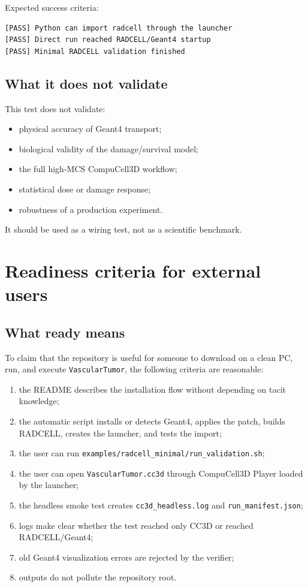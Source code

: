 \documentclass[11pt,a4paper,twoside,pdftex]{refrep}
\begin{document}
Expected success criteria:

\begin{lstlisting}
[PASS] Python can import radcell through the launcher
[PASS] Direct run reached RADCELL/Geant4 startup
[PASS] Minimal RADCELL validation finished
\end{lstlisting}

\section{What it does not validate}

This test does not validate:

\begin{itemize}
  \item physical accuracy of Geant4 transport;
  \item biological validity of the damage/survival model;
  \item the full high-MCS CompuCell3D workflow;
  \item statistical dose or damage response;
  \item robustness of a production experiment.
\end{itemize}

It should be used as a wiring test, not as a scientific benchmark.

\chapter{Readiness criteria for external users}

\section{What ready means}

To claim that the repository is useful for someone to download on a clean PC, run, and execute \texttt{VascularTumor}, the following criteria are reasonable:

\begin{enumerate}
  \item the README describes the installation flow without depending on tacit knowledge;
  \item the automatic script installs or detects Geant4, applies the patch, builds RADCELL, creates the launcher, and tests the import;
  \item the user can run \texttt{examples/radcell\_minimal/run\_validation.sh};
  \item the user can open \texttt{VascularTumor.cc3d} through CompuCell3D Player loaded by the launcher;
  \item the headless smoke test creates \texttt{cc3d\_headless.log} and \texttt{run\_manifest.json};
  \item logs make clear whether the test reached only CC3D or reached RADCELL/Geant4;
  \item old Geant4 visualization errors are rejected by the verifier;
  \item outputs do not pollute the repository root.
\end{enumerate}
\end{document}
